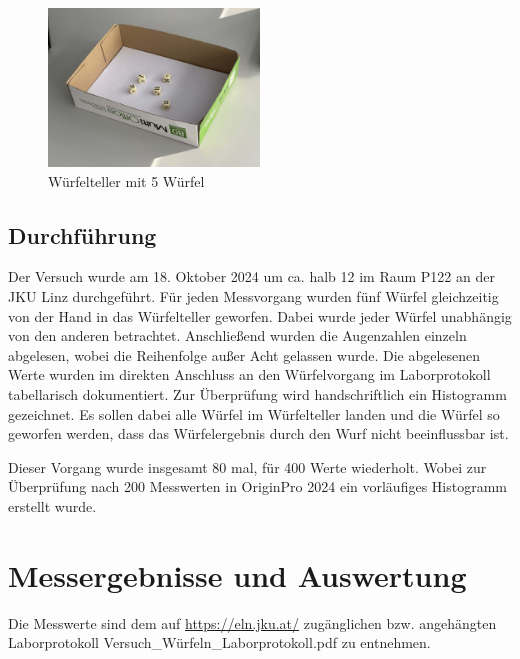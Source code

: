 \documentclass[a4paper,12pt]{article}
\begin{document}
\begin{figure}[H]
    \centering
    \includegraphics[width=0.5\textwidth]{bilder/IMG_7612.jpg}
    \caption{Würfelteller mit 5 Würfel}
    \label{Abb1}
\end{figure}

\subsection{Durchführung}
Der Versuch wurde am 18. Oktober 2024 um ca. halb 12 im Raum P122 an der JKU Linz durchgeführt.
Für jeden Messvorgang wurden fünf Würfel gleichzeitig von der Hand in das Würfelteller geworfen. Dabei wurde jeder Würfel 
unabhängig von den anderen betrachtet. Anschließend wurden die Augenzahlen einzeln abgelesen, wobei die Reihenfolge außer 
Acht gelassen wurde. Die abgelesenen Werte wurden im direkten Anschluss an den Würfelvorgang im Laborprotokoll tabellarisch 
dokumentiert. Zur Überprüfung wird handschriftlich ein Histogramm gezeichnet. Es sollen dabei alle Würfel im Würfelteller 
landen und die Würfel so geworfen werden, dass das Würfelergebnis durch den Wurf nicht beeinflussbar ist.

Dieser Vorgang wurde insgesamt 80 mal, für 400 Werte wiederholt. Wobei zur Überprüfung nach 200 Messwerten in OriginPro 
2024 ein vorläufiges Histogramm erstellt wurde. 

\section{Messergebnisse und Auswertung}
Die Messwerte sind dem auf \url{https://eln.jku.at/} zugänglichen bzw. angehängten Laborprotokoll \glqq Versuch_Würfeln_Laborprotokoll.pdf\grqq{} zu entnehmen.

\end{document}
